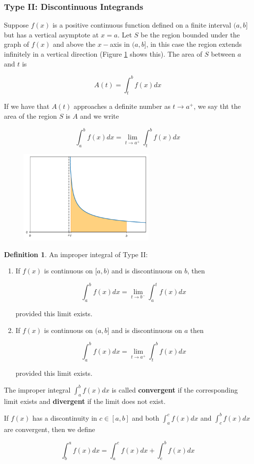 \documentclass[a4paper,11pt]{article}
\theoremstyle{definition}
\newtheorem{definition}{Definition}
\theoremstyle{plain}
\begin{document}
\subsubsection{Type II: Discontinuous Integrands}\label{type-ii-discontinuous-integrands}

Suppose \(f(x)\) is a positive continuous function defined on a finite interval \((a,b]\) but has a vertical asymptote at \(x=a\). Let \(S\) be the region bounded under the graph of \(f(x)\) and above the \(x-\)axis in \((a,b]\), in this case the region extends infinitely in a vertical direction (Figure \ref{fig:improper_type2} shows this). The area of \(S\) between \(a\) and \(t\) is

\[
A(t) = \int^b_t f(x) dx
\]

If we have that \(A(t)\) approaches a definite number as \(t\rightarrow a^{+}\), we say tht the area of the region \(S\) is \(A\) and we write

\[
\int^b_a f(x) dx = \lim_{t\rightarrow a^{+}} \int^b_t f(x) dx
\]

\begin{figure}[htbp]
	\centering 
		\includegraphics[width = 0.6\textwidth]{Ch3_files/Ch3_41_0.pdf}
		\caption{}
		\label{fig:improper_type2}
\end{figure}

\begin{definition}
An improper integral of Type II: 

\begin{enumerate}
	\item If \(f(x)\) is continuous on \([a,b)\) and is discontinuous on \(b\), then

	\[
	\int^{b}_a f(x) dx = \lim_{t\rightarrow b^{-}}\int^t_a f(x) dx
	\]

	provided this limit exists.

	\item If \(f(x)\) is continuous on \((a,b]\) and is discontinuous on \(a\) then
	
	\[
	\int^{b}_a f(x) dx = \lim_{t\rightarrow a^{+}}\int^b_t f(x) dx
	\]

	provided this limit exists.
\end{enumerate}

The improper integral \(\int^b_a f(x) dx\) is called \textbf{convergent} if the corresponding limit exists and \textbf{divergent} if the limit does not exist.

If \(f(x)\) has a discontinuity in \(c\in[a,b]\) and both \(\int^c_a f(x) dx\) and \(\int^b_c f(x) dx\) are convergent, then we define

\[
\int_{b}^{a} f(x) dx = \int_{a}^c f(x) dx + \int^{b}_c f(x) dx
\]
\end{definition}
\end{document}
